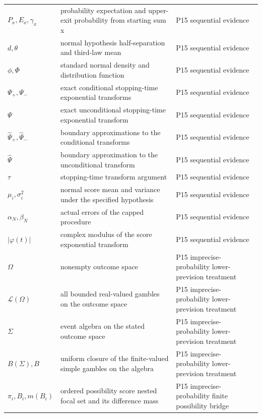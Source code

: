 \begin{longtable}{@{}p{}p{}p{}@{}}
\(P_x,\allowbreak E_x,\allowbreak \gamma_x\) & probability expectation and upper-exit probability from starting sum x & P15 sequential evidence \\
\(d,\allowbreak \theta\) & normal hypothesis half-separation and third-law mean & P15 sequential evidence \\
\(\phi,\allowbreak \Phi\) & standard normal density and distribution function & P15 sequential evidence \\
\(\Psi_+,\allowbreak \Psi_-\) & exact conditional stopping-time exponential transforms & P15 sequential evidence \\
\(\Psi\) & exact unconditional stopping-time exponential transform & P15 sequential evidence \\
\(\widehat\Psi_+,\allowbreak \widehat\Psi_-\) & boundary approximations to the conditional transforms & P15 sequential evidence \\
\(\widehat\Psi\) & boundary approximation to the unconditional transform & P15 sequential evidence \\
\(\tau\) & stopping-time transform argument & P15 sequential evidence \\
\(\mu_i,\allowbreak \sigma_i^2\) & normal score mean and variance under the specified hypothesis & P15 sequential evidence \\
\(\alpha_N,\allowbreak \beta_N\) & actual errors of the capped procedure & P15 sequential evidence \\
\(|\varphi(t)|\) & complex modulus of the score exponential transform & P15 sequential evidence \\
\(\Omega\) & nonempty outcome space & P15 imprecise-\allowbreak{}probability lower-\allowbreak{}prevision treatment \\
\(\mathcal L(\Omega)\) & all bounded real-valued gambles on the outcome space & P15 imprecise-\allowbreak{}probability lower-\allowbreak{}prevision treatment \\
\(\Sigma\) & event algebra on the stated outcome space & P15 imprecise-\allowbreak{}probability lower-\allowbreak{}prevision treatment \\
\(B(\Sigma),\allowbreak B\) & uniform closure of the finite-valued simple gambles on the algebra & P15 imprecise-\allowbreak{}probability lower-\allowbreak{}prevision treatment \\
\(\pi_i,\allowbreak B_i,\allowbreak m(B_i)\) & ordered possibility score nested focal set and its difference mass & P15 imprecise-\allowbreak{}probability finite possibility bridge \\

\end{longtable}
